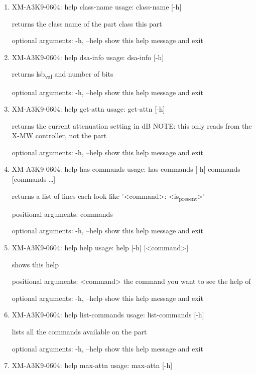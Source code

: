 \documentclass[11pt]{article}
\begin{document}
\begin{enumerate}
\item XM-A3K9-0604: help class-name
\label{sec:org147b04a}
usage: class-name [-h]

returns the class name of the part class this part

optional arguments:
  -h, --help  show this help message and exit

\item XM-A3K9-0604: help dsa-info
\label{sec:org0a212e1}
usage: dsa-info [-h]

returns lsb\textsubscript{val} and number of bits

optional arguments:
  -h, --help  show this help message and exit

\item XM-A3K9-0604: help get-attn
\label{sec:org73abc81}
usage: get-attn [-h]

returns the current attenuation setting in dB NOTE: this only reads from the
X-MW controller, not the part

optional arguments:
  -h, --help  show this help message and exit

\item XM-A3K9-0604: help has-commands
\label{sec:orged06dd4}
usage: has-commands [-h] commands [commands \ldots{}]

returns a list of lines each look like '<command>: <is\textsubscript{present}>'

positional arguments:
  commands

optional arguments:
  -h, --help  show this help message and exit

\item XM-A3K9-0604: help help
\label{sec:orgd127fea}
usage: help [-h] [<command>]

shows this help

positional arguments:
  <command>   the command you want to see the help of

optional arguments:
  -h, --help  show this help message and exit

\item XM-A3K9-0604: help list-commands
\label{sec:org312690b}
usage: list-commands [-h]

lists all the commands available on the part

optional arguments:
  -h, --help  show this help message and exit

\item XM-A3K9-0604: help max-attn
\label{sec:org7cedef6}
usage: max-attn [-h]


\end{enumerate}
\end{document}
